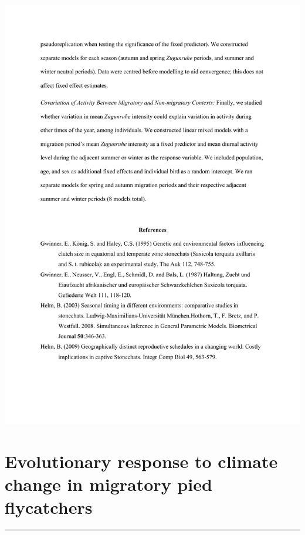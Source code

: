 \documentclass[a4paper, twoside]{templates/ociamthesis}
\begin{document}
\includegraphics[width=1\linewidth]{pdf_chapters/zug/zug_supp_crop_Part9}

\hypertarget{evolutionary-response}{%
\chapter{Evolutionary response to climate change in migratory pied flycatchers}\label{evolutionary-response}}

\minitoc 

\begin{center}\rule{0.5\linewidth}{\linethickness}\end{center}
\end{document}
